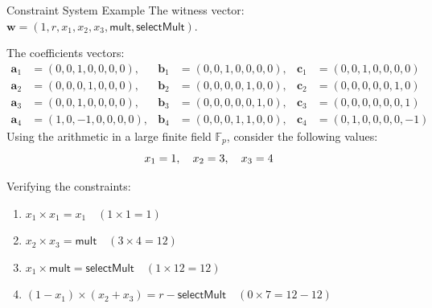 \documentclass{beamer}
\begin{document}
    \begin{frame}[fragile]{Constraint System Example}
        The witness vector: $\mathbf{w} = (1, r, x_1, x_2, x_3, \mathsf{mult}, \mathsf{selectMult})$.

        \vspace{2pt}
        The coefficients vectors:
        \vspace{-5pt}
        \begin{align*}
            \mathbf{a}_1 &= (0, 0, 1, 0, 0, 0, 0), & \mathbf{b}_1 &= (0, 0, 1, 0, 0, 0, 0), & \mathbf{c}_1 &= (0, 0, 1, 0, 0, 0, 0) \\
            \mathbf{a}_2 &= (0, 0, 0, 1, 0, 0, 0), & \mathbf{b}_2 &= (0, 0, 0, 0, 1, 0, 0), & \mathbf{c}_2 &= (0, 0, 0, 0, 0, 1, 0) \\
            \mathbf{a}_3 &= (0, 0, 1, 0, 0, 0, 0), & \mathbf{b}_3 &= (0, 0, 0, 0, 0, 1, 0), & \mathbf{c}_3 &= (0, 0, 0, 0, 0, 0, 1) \\
            \mathbf{a}_4 &= (1, 0, -1, 0, 0, 0, 0), & \mathbf{b}_4 &= (0, 0, 0, 1, 1, 0, 0), & \mathbf{c}_4 &= (0, 1, 0, 0, 0, 0, -1)
        \end{align*}
        Using the arithmetic in a large finite field $\mathbb{F}_p$, consider the following values:
        \vspace{-10pt}
        \begin{equation*}
            x_1 = 1, \quad x_2 = 3, \quad x_3 = 4
            \vspace{-5pt}
        \end{equation*}
    
        Verifying the constraints:
        \begin{enumerate}
            \item \( x_1 \times x_1 = x_1 \quad (1 \times 1 = 1) \)
            \item \( x_2 \times x_3 = \mathsf{mult} \quad (3 \times 4 = 12) \)
            \item \( x_1 \times \mathsf{mult} = \mathsf{selectMult} \quad (1 \times 12 = 12) \)
            \item \( (1 - x_1) \times (x_2 + x_3) = r - \mathsf{selectMult} \quad (0 \times 7 = 12 - 12) \)
        \end{enumerate}
    \end{frame}
\end{document}
